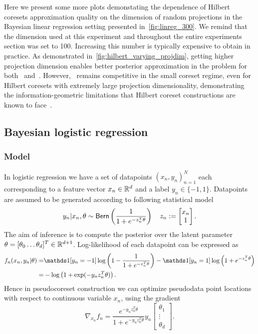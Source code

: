 Here we present some more plots demonstating the dependence of Hilbert coresets approximation quality on the dimension of random projections in the Bayesian linear regression setting presented in~\cref{fig:linreg_300}. We remind that the dimension used at this experiment and throughout the entire experiments section was set to 100. Increasing this number is typically expensive to obtain in practice. As demonstrated in~\cref{fig:hilbert_varying_projdim}, getting higher projection dimension enables better posterior approximation in the problem for both \gigao~and~\gigar. However, \psvi~remains competitive in the small coreset regime, even for Hilbert coresets with extremely large projection dimensionality, demonstrating the information-geometric limitations that Hilbert coreset constructions are known to face~\cite{campbell19neurips}.


\subsection{Bayesian logistic regression}
\label{app:logreg_experiment_appendix}

\subsubsection{Model}
\label{app:logreg_model_appendix}
In logistic regression we have a set of datapoints $(x_n, y_n)_{n=1}^{N}$ each corresponding to a feature vector ${x_n \in \mathbb{R}^d}$ and a label ${y_n \in \{-1, 1\}}$. Datapoints are assumed to be generated according to following statistical model
\[
y_n | x_n, \theta \sim {\sf{Bern}} \left( \frac{1}{1+e^{-z_n^T \theta}} \right) 
\quad 
z_n := \begin{bmatrix}
x_n \\
1
\end{bmatrix}.
\label{eq:logreg-model}
\]
The aim of inference is to compute the posterior over the latent parameter $ \theta = [\theta_0 \ldots \theta_d]^T \in \mathbb{R}^{d+1}$.
Log-likelihood of each datapoint can be expressed as
\[
\begin{split}
f_n(x_n, y_n|\theta)  
=&\ind{[y_n=-1]}\log \left( 1 - \frac{1}{1+e^{-z_n^T \theta}}\right) 
- \ind{[y_n=1]} \log \left( 1+ e^{-z_n^T \theta}  \right) \\
=&-\log\left( 1 + \exp(-y_n z_n^T\theta)\right).
\label{eq:logreg-loglik}
\end{split}
\]
Hence in pseudocoreset construction we can optimize pseudodata point locations with respect to continuous variable $ x_n$, using the gradient
\[
\nabla_{x_n}f_n =  \frac{e^{-y_n z_n^T \theta}}{1+e^{-y_n z_n^T \theta}}y_n \begin{bmatrix}
\theta_1 \\
\vdots \\
\theta_d
\end{bmatrix}.
\label{eq:logreg-loglik-locgrad}
\]



